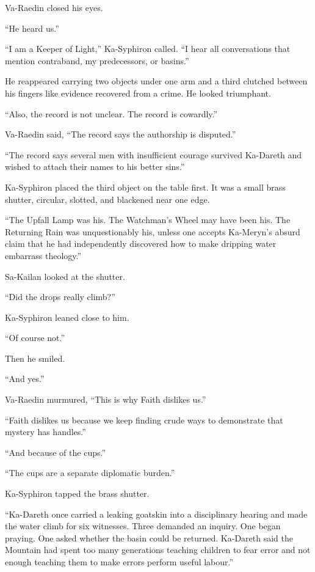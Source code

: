 Va-Raedin closed his eyes.\par
“He heard us.”\par
“I am a Keeper of Light,” Ka-Syphiron called. “I hear all conversations that mention contraband, my predecessors, or basins.”\par
He reappeared carrying two objects under one arm and a third clutched between his fingers like evidence recovered from a crime. He looked triumphant.\par
“Also, the record is not unclear. The record is cowardly.”\par
Va-Raedin said, “The record says the authorship is disputed.”\par
“The record says several men with insufficient courage survived Ka-Dareth and wished to attach their names to his better sins.”\par
Ka-Syphiron placed the third object on the table first. It was a small brass shutter, circular, slotted, and blackened near one edge.\par
“The Upfall Lamp was his. The Watchman’s Wheel may have been his. The Returning Rain was unquestionably his, unless one accepts Ka-Meryn’s absurd claim that he had independently discovered how to make dripping water embarrass theology.”\par
Sa-Kailan looked at the shutter.\par
“Did the drops really climb?”\par
Ka-Syphiron leaned close to him.\par
“Of course not.”\par
Then he smiled.\par
“And yes.”\par
Va-Raedin murmured, “This is why Faith dislikes us.”\par
“Faith dislikes us because we keep finding crude ways to demonstrate that mystery has handles.”\par
“And because of the cups.”\par
“The cups are a separate diplomatic burden.”\par
Ka-Syphiron tapped the brass shutter.\par
“Ka-Dareth once carried a leaking goatskin into a disciplinary hearing and made the water climb for six witnesses. Three demanded an inquiry. One began praying. One asked whether the basin could be returned. Ka-Dareth said the Mountain had spent too many generations teaching children to fear error and not enough teaching them to make errors perform useful labour.”\par
